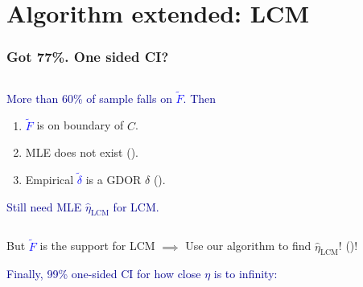 \documentclass[ 10pt]{beamer}
\newcommand{\fatdot}{\,\cdot\,}
\newcommand{\etaLCM}{\hat{\eta}_{\textrm{LCM}}}
\begin{document}
\section{Algorithm extended: LCM}
\frame
{
\frametitle{Got 77\%.  One sided CI?}  
\begin{columns}[]
\begin{column}[T]{0.8\textwidth}
\textcolor{darkblue}{ More than 60\% of sample falls on \textcolor{blue}{$\tilde{F}$}.  Then}
\begin{enumerate}
\item \textcolor{blue}{$\tilde{F}$} is on boundary of $C$. %
\item MLE does not exist (\alert{\checkmark}).
\item Empirical \textcolor{blue}{$\tilde{\delta}$} is a GDOR $\delta$ (\alert{\checkmark}).
\end{enumerate}
\vspace{1mm}

\textcolor{darkblue}{Still need MLE $\etaLCM$ for LCM.}
\end{column}
\end{columns}
\vspace{1mm}
\pause

But \textcolor{blue}{$\tilde{F}$} is the support for LCM
$\implies$ Use our algorithm to find $\etaLCM$!   (\alert{\checkmark})!
\vspace{5mm}

\pause

\textcolor{darkblue}{Finally, 99\% one-sided CI for how close $\eta$ is to infinity:}  


}
\end{document}
